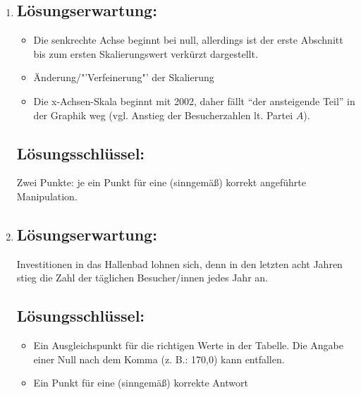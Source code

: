 \begin{langesbeispiel}
{\begin{enumerate}
	\item \subsection{Lösungserwartung:}
	\begin{itemize}
		\item Die senkrechte Achse beginnt bei null, allerdings ist der erste Abschnitt bis zum ersten  Skalierungswert verkürzt dargestellt. 
		\item Änderung/"'Verfeinerung"' der Skalierung
		\item Die x-Achsen-Skala beginnt mit 2002, daher fällt "`der ansteigende Teil"' in der Graphik weg (vgl. Anstieg der Besucherzahlen lt. Partei $A$).
	\end{itemize}
	
	\subsection{Lösungsschlüssel:}
	Zwei Punkte: je ein Punkt für eine (sinngemäß) korrekt angeführte Manipulation.
	
	\item \subsection{Lösungserwartung:} 
	\leer

Investitionen in das Hallenbad lohnen sich, denn in den letzten acht Jahren stieg die Zahl der täglichen Besucher/innen jedes Jahr an.

\subsection{Lösungsschlüssel:}
\begin{itemize}
	\item Ein Ausgleichspunkt für die richtigen Werte in der Tabelle. Die Angabe einer Null nach dem Komma (z. B.: 170,0) kann entfallen.
	\item Ein Punkt für eine (sinngemäß) korrekte Antwort
\end{itemize}
\end{enumerate}}
		\end{langesbeispiel}